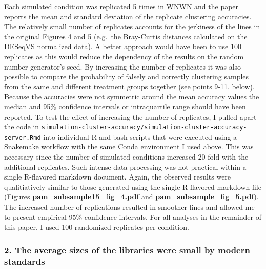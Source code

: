 \documentclass[
]{article}
\begin{document}
Each simulated condition was replicated 5 times in WNWN and the paper
reports the mean and standard deviation of the replicate clustering
accuracies. The relatively small number of replicates accounts for the
jerkiness of the lines in the original Figures 4 and 5 (e.g.~the
Bray-Curtis distances calculated on the DESeqVS normalized data). A
better approach would have been to use 100 replicates as this would
reduce the dependency of the results on the random number generator's
seed. By increasing the number of replicates it was also possible to
compare the probability of falsely and correctly clustering samples from
the same and different treatment groups together (see points 9-11,
below). Because the accuracies were not symmetric around the mean
accuracy values the median and 95\% confidence intervals or
intraquartile range should have been reported. To test the effect of
increasing the number of replicates, I pulled apart the code in
\texttt{simulation-cluster-accuracy/simulation-cluster-accuracy-server.Rmd}
into individual R and bash scripts that were executed using a Snakemake
workflow with the same Conda environment I used above. This was
necessary since the number of simulated conditions increased 20-fold
with the additional replicates. Such intense data processing was not
practical within a single R-flavored markdown document. Again, the
observed results were qualitiatively similar to those generated using
the single R-flavored markdown file (Figures
\textbf{pam\_subsample15\_fig\_4.pdf} and
\textbf{pam\_subsample\_fig\_5.pdf}). The increased number of
replications resulted in smoother lines and allowed me to present
empirical 95\% confidence intervals. For all analyses in the remainder
of this paper, I used 100 randomized replicates per condition.

\hypertarget{the-average-sizes-of-the-libraries-were-small-by-modern-standards}{%
\subsubsection{2. The average sizes of the libraries were small by
modern
standards}\label{the-average-sizes-of-the-libraries-were-small-by-modern-standards}}
\end{document}
